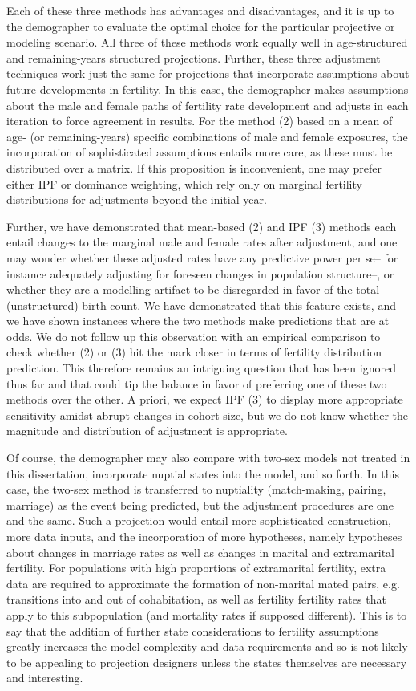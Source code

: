 Each of these three methods has advantages and disadvantages, and it is up to
the demographer to evaluate the optimal choice for the particular projective or
modeling scenario. All three of these methods work equally well in
age-structured and remaining-years structured projections. Further, these three
adjustment techniques work just the same for projections that incorporate
assumptions about future developments in fertility. In this case, the
demographer makes assumptions about the male and female paths of fertility 
rate development and adjusts in each
iteration to force agreement in results. For the method (2) based on a mean of
age- (or remaining-years) specific combinations of male and female exposures,
the incorporation of sophisticated assumptions entails more care, as these must be
distributed over a matrix. If this proposition is inconvenient, one may prefer
either IPF or dominance weighting, which rely only on marginal fertility
distributions for adjustments beyond the initial year.

Further, we have demonstrated that mean-based (2) and IPF (3) methods each
entail changes to the marginal male and female rates after adjustment, and one
may wonder whether these adjusted rates have any predictive power per se-- for
instance adequately adjusting for foreseen changes in population structure--, or
whether they are a modelling artifact to be disregarded in favor of the total 
(unstructured) birth count. We have demonstrated that this feature exists,
and we have shown instances where the two methods make predictions that are at
odds. We do not follow up this observation with an empirical comparison
to check whether (2) or (3) hit the mark closer in terms of
fertility distribution prediction. This therefore remains an intriguing question
that has been ignored thus far and that could tip the balance in favor of
preferring one of these two methods over the other. A priori, we expect IPF (3) 
to display more appropriate sensitivity amidst abrupt
changes in cohort size, but we do not know whether the magnitude and
distribution of adjustment is appropriate. 

Of course, the demographer may also compare with two-sex models not treated
in this dissertation, incorporate nuptial states into the model, and so
forth. In this case, the two-sex method is transferred to nuptiality
(match-making, pairing, marriage) as the event being predicted, but the
adjustment procedures are one and the same. Such a projection would
entail more sophisticated construction, more data inputs, and the incorporation of more hypotheses,
namely hypotheses about changes in marriage rates as well as changes in marital
and extramarital fertility. For populations with high proportions of
extramarital fertility, extra data are required to approximate the formation of
non-marital mated pairs, e.g. transitions into and out of cohabitation, as well
as fertility fertility rates that apply to this subpopulation (and mortality
rates if supposed different). This is to say that the addition of further state
considerations to fertility assumptions greatly increases the model complexity
and data requirements and so is not likely to be appealing to projection
designers unless the states themselves are necessary and interesting.

